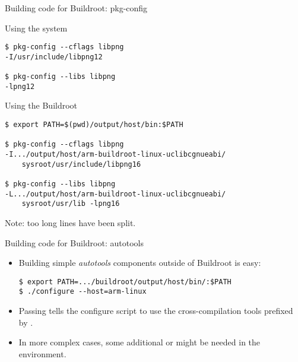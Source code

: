 \begin{frame}[fragile]{Building code for Buildroot: pkg-config}

  \begin{block}{Using the system }
{\small
\begin{verbatim}
$ pkg-config --cflags libpng
-I/usr/include/libpng12

$ pkg-config --libs libpng
-lpng12
\end{verbatim}}
  \end{block}

  \begin{block}{Using the Buildroot }
{\small
\begin{verbatim}
$ export PATH=$(pwd)/output/host/bin:$PATH

$ pkg-config --cflags libpng
-I.../output/host/arm-buildroot-linux-uclibcgnueabi/
    sysroot/usr/include/libpng16

$ pkg-config --libs libpng
-L.../output/host/arm-buildroot-linux-uclibcgnueabi/
    sysroot/usr/lib -lpng16
\end{verbatim}}
  \end{block}

{\tiny Note: too long lines have been split.}

\end{frame}

\begin{frame}[fragile]{Building code for Buildroot: autotools}
  \begin{itemize}
  \item Building simple {\em autotools} components outside of
    Buildroot is easy:
    \begin{block}{}
{\small
\begin{verbatim}
$ export PATH=.../buildroot/output/host/bin/:$PATH
$ ./configure --host=arm-linux
\end{verbatim}}
\end{block}
\item Passing  tells the configure script to
  use the cross-compilation tools prefixed by .
\item In more complex cases, some additional  or
   might be needed in the environment.
  \end{itemize}
\end{frame}

